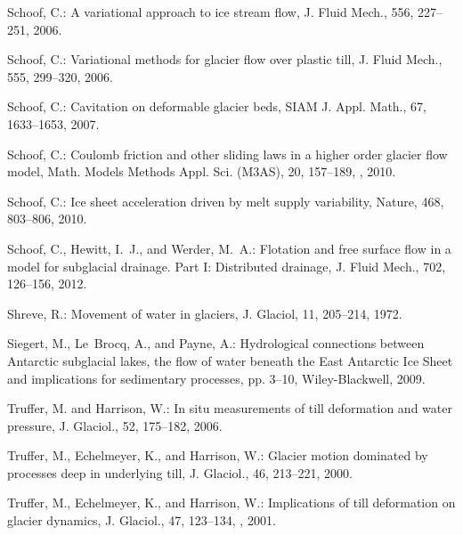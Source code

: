 \documentclass[gmd]{copernicus}   %
\begin{document}
\begin{thebibliography}{}
Schoof, C.: A variational approach to ice stream flow, J. Fluid Mech., 556,
  227--251, 2006{}.

Schoof, C.: Variational methods for glacier flow over plastic till, J. Fluid
  Mech., 555, 299--320, 2006{}.

Schoof, C.: Cavitation on deformable glacier beds, SIAM J. Appl. Math., 67,
  1633--1653, 2007.

Schoof, C.: Coulomb friction and other sliding laws in a higher order glacier
  flow model, Math. Models Methods Appl. Sci. (M3AS), 20, 157--189,
  , 2010{}.

Schoof, C.: Ice sheet acceleration driven by melt supply variability, Nature,
  468, 803--806, 2010{}.

Schoof, C., Hewitt, I.~J., and Werder, M.~A.: Flotation and free surface flow
  in a model for subglacial drainage. {P}art {I}: {D}istributed drainage, J.
  Fluid Mech., 702, 126--156, 2012.

Shreve, R.: Movement of water in glaciers, J. Glaciol, 11, 205--214, 1972.

Siegert, M., Le~Brocq, A., and Payne, A.: Hydrological connections between
  Antarctic subglacial lakes, the flow of water beneath the East Antarctic Ice
  Sheet and implications for sedimentary processes, pp. 3--10, Wiley-Blackwell,
  2009.

Truffer, M. and Harrison, W.: In situ measurements of till deformation and
  water pressure, J. Glaciol., 52, 175--182, 2006.

Truffer, M., Echelmeyer, K., and Harrison, W.: Glacier motion dominated by
  processes deep in underlying till, J. Glaciol., 46, 213--221, 2000.

Truffer, M., Echelmeyer, K., and Harrison, W.: Implications of till deformation
  on glacier dynamics, J. Glaciol., 47, 123--134,
  , 2001.


\end{thebibliography}
\end{document}
